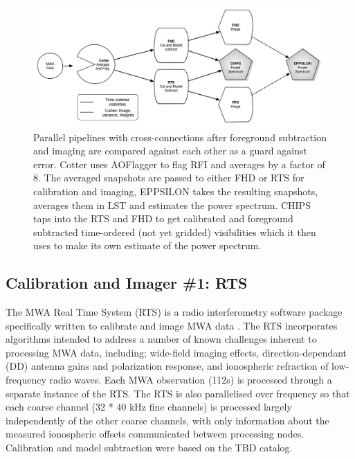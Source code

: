 \documentclass[preprint2]{aastex}
\begin{document}
\begin{figure}[htbp]
\begin{center}
\includegraphics[width=\textwidth]{figures/MWA_Pipes.png}
\caption{Parallel pipelines with cross-connections after foreground subtraction and imaging are compared against each other as a guard against error.  Cotter uses AOFlagger to flag RFI and averages by a factor of 8. The averaged snapshots are passed to either FHD or RTS for calibration and imaging, EPPSILON takes the resulting snapshots, averages them in LST and estimates the power spectrum. CHIPS taps into the RTS and FHD to get calibrated and foreground subtracted time-ordered (not yet gridded) visibilities which it then uses to make its own estimate of the power spectrum. }
\label{fig:pipes}
\end{center}
\end{figure}

\subsection{Calibration and Imager \#1: RTS}
\label{sec:RTS}
The MWA Real Time System (RTS) is a radio interferometry software package specifically written to calibrate and image MWA data \citep[][Mitchell et al. in prep]{Ord:2010p7534}. The RTS incorporates algorithms intended to address a number of known challenges inherent to processing MWA data, including; wide-field imaging effects, direction-dependant (DD) antenna gains and polarization response, and ionospheric refraction of low-frequency radio waves. Each MWA observation (112s) is processed through a separate instance of the RTS. The RTS is also parallelised over frequency so that each coarse channel (32 * 40 kHz fine channels) is processed largely independently of the other coarse channels, with only information about the measured ionospheric offsets communicated between processing nodes.  Calibration and model subtraction were based on the TBD catalog. 
\end{document}
